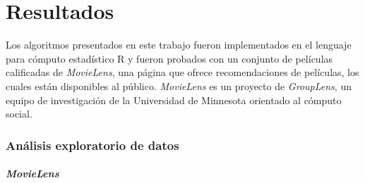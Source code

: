 \chapter{Resultados}

Los algoritmos presentados en este trabajo fueron implementados en el lenguaje para cómputo estadístico R y fueron probados con un conjunto de películas calificadas de \textit{MovieLens}, una página que ofrece recomendaciones de películas, los cuales están disponibles al público. \textit{MovieLens} es un proyecto de \textit{GroupLens}, un equipo de investigación de la Universidad de Minnesota orientado al cómputo social.

\subsection{Análisis exploratorio de datos}

\subsubsection{\textit{MovieLens}}



